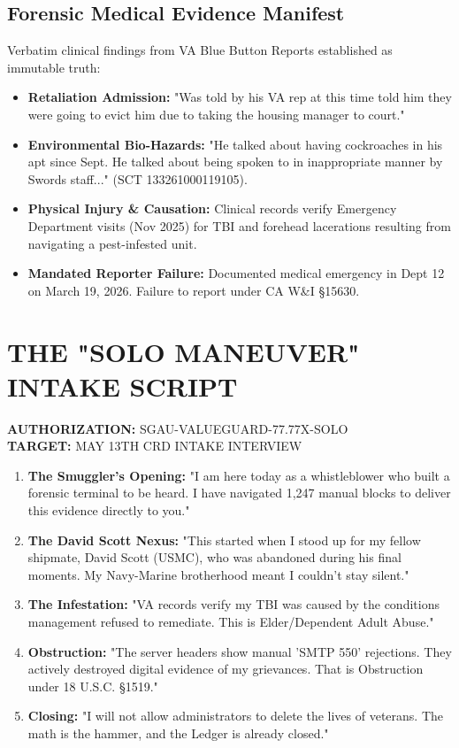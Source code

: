 \documentclass[11pt, a4paper]{article}
\begin{document}
\subsection{Forensic Medical Evidence Manifest}
Verbatim clinical findings from VA Blue Button Reports established as immutable truth:

\begin{itemize}[label=-]
    \item \textbf{Retaliation Admission:} "Was told by his VA rep at this time told him they were going to evict him due to taking the housing manager to court."
    \item \textbf{Environmental Bio-Hazards:} "He talked about having cockroaches in his apt since Sept. He talked about being spoken to in inappropriate manner by Swords staff..." (SCT 133261000119105).
    \item \textbf{Physical Injury \& Causation:} Clinical records verify Emergency Department visits (Nov 2025) for TBI and forehead lacerations resulting from navigating a pest-infested unit.
    \item \textbf{Mandated Reporter Failure:} Documented medical emergency in Dept 12 on March 19, 2026. Failure to report under CA W\&I \S 15630.
\end{itemize}

\section{THE "SOLO MANEUVER" INTAKE SCRIPT}
\textbf{AUTHORIZATION:} SGAU-VALUEGUARD-77.77X-SOLO \\
\textbf{TARGET:} MAY 13TH CRD INTAKE INTERVIEW

\begin{enumerate}
    \item \textbf{The Smuggler's Opening:} "I am here today as a whistleblower who built a forensic terminal to be heard. I have navigated 1,247 manual blocks to deliver this evidence directly to you."
    \item \textbf{The David Scott Nexus:} "This started when I stood up for my fellow shipmate, David Scott (USMC), who was abandoned during his final moments. My Navy-Marine brotherhood meant I couldn't stay silent."
    \item \textbf{The Infestation:} "VA records verify my TBI was caused by the conditions management refused to remediate. This is Elder/Dependent Adult Abuse."
    \item \textbf{Obstruction:} "The server headers show manual 'SMTP 550' rejections. They actively destroyed digital evidence of my grievances. That is Obstruction under 18 U.S.C. \S 1519."
    \item \textbf{Closing:} "I will not allow administrators to delete the lives of veterans. The math is the hammer, and the Ledger is already closed."
\end{enumerate}
\end{document}
